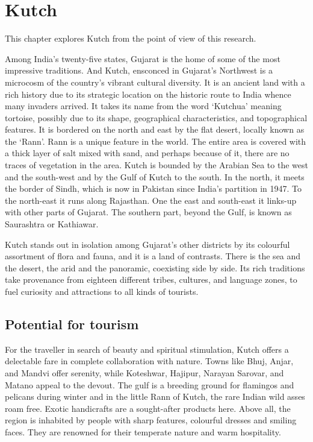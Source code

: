 \chapter{Kutch} %
\label{cha:kutch}

This chapter explores Kutch from the point of view of this research.

Among India's twenty-five states, Gujarat is the home of some of the most impressive traditions. And Kutch, ensconced in Gujarat's Northwest is a microcosm of the country's vibrant cultural diversity. It is an ancient land with a rich history due to its strategic location on the historic route to India whence many invaders arrived. It takes its name from the word `Kutchua' meaning tortoise, possibly due to its shape, geographical characteristics, and topographical features. It is bordered on the north and east by the flat desert, locally known as the `Rann'. Rann is a unique feature in the world. The entire area is covered with a thick layer of salt mixed with sand, and perhaps because of it, there are no traces of vegetation in the area. Kutch is bounded by the Arabian Sea to the west and the south-west and by the Gulf of Kutch to the south. In the north, it meets the border of Sindh, which is now in Pakistan since India's partition in 1947. To the north-east it runs along Rajasthan. One the east and south-east it links-up with other parts of Gujarat. The southern part, beyond the Gulf, is known as Saurashtra or Kathiawar.

Kutch stands out in isolation among Gujarat's other districts by its colourful assortment of flora and fauna, and it is a land of contrasts. There is the sea and the desert, the arid and the panoramic, coexisting side by side. Its rich traditions take provenance from eighteen different tribes, cultures, and language zones, to fuel curiosity and attractions to all kinds of tourists.

\section{Potential for tourism} %
\label{sec:pot}

For the traveller in search of beauty and spiritual stimulation, Kutch offers a delectable fare in complete collaboration with nature. Towns like Bhuj, Anjar, and Mandvi offer serenity, while Koteshwar, Hajipur, Narayan Sarovar, and Matano appeal to the devout. The gulf is a breeding ground for flamingos and pelicans during winter and in the little Rann of Kutch, the rare Indian wild asses roam free. Exotic handicrafts are a sought-after products here. Above all, the region is inhabited by people with sharp features, colourful dresses and smiling faces. They are renowned for their temperate nature and warm hospitality.

